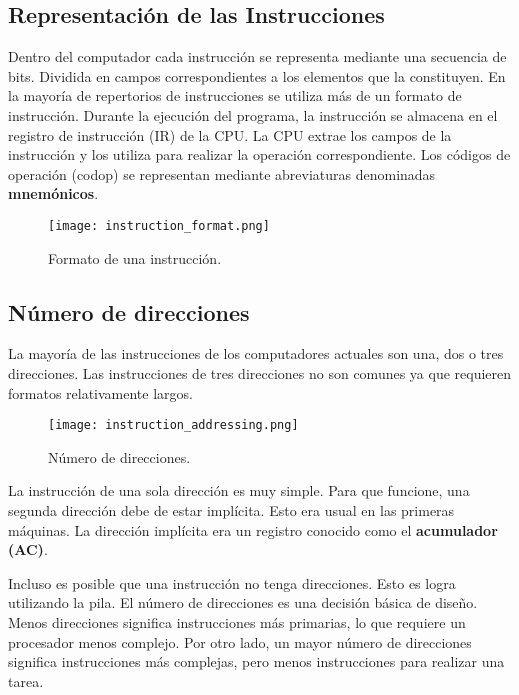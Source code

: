 \documentclass{article}
\begin{document}
\subsection*{Representaci\'{o}n de las Instrucciones}
Dentro del computador cada instrucci\'{o}n se representa mediante una
secuencia de bits. Dividida en campos correspondientes a los elementos
que la constituyen. En la mayor\'{i}a de repertorios de instrucciones
se utiliza m\'{a}s de un formato de instrucci\'{o}n. Durante la ejecuci\'{o}n
del programa, la instrucci\'{o}n se almacena en el registro de instrucci\'{o}n
(IR) de la CPU. La CPU extrae los campos de la instrucci\'{o}n y los
utiliza para realizar la operaci\'{o}n correspondiente. Los c\'{o}digos de
operaci\'{o}n (codop) se representan mediante abreviaturas denominadas
\textbf{mnem\'{o}nicos}.

\begin{figure}[h]
    \centering
    \texttt{[image: instruction\_format.png]}
    \caption{Formato de una instrucci\'{o}n.
    \cite {stallings2006organización}}
\end{figure}

\subsection*{N\'{u}mero de direcciones}
La mayor\'{i}a de las instrucciones de los computadores actuales son
una, dos o tres direcciones. Las instrucciones de tres direcciones
no son comunes ya que requieren formatos relativamente largos.

\begin{figure}[h]
    \centering
    \vspace{0.25cm}
    \texttt{[image: instruction\_addressing.png]}
    \caption{N\'{u}mero de direcciones.
    \cite {stallings2006organización}}
\end{figure}

\begin{flushleft}
    La instrucci\'{o}n de una sola direcci\'{o}n es muy simple. Para que funcione,
    una segunda direcci\'{o}n debe de estar impl\'{i}cita. Esto era usual en las
    primeras m\'{a}quinas. La direcci\'{o}n impl\'{i}cita era un registro conocido
    como el \textbf{acumulador (AC)}.
\end{flushleft}
Incluso es posible que una instrucci\'{o}n no tenga direcciones. Esto
es logra utilizando la pila. El n\'{u}mero de direcciones es una decisi\'{o}n
b\'{a}sica de dise\~{n}o. Menos direcciones significa instrucciones m\'{a}s primarias,
lo que requiere un procesador menos complejo. Por otro lado, un mayor n\'{u}mero de
direcciones significa instrucciones m\'{a}s complejas, pero menos instrucciones para
realizar una tarea.
\end{document}

